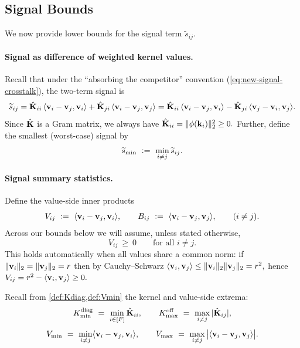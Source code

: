 \subsection{Signal Bounds}
We now provide lower bounds for the signal term $\widetilde{s}_{ij}$.

\paragraph{Signal as difference of weighted kernel values.}
Recall that under the ``absorbing the competitor'' convention (\eqref{eq:new-signal-crosstalk}), the two-term signal is
\begin{equation}
\widetilde{s}_{ij}
=\hat{\mathbf{K}}_{ii}\,\langle {{\mathbf{v}}_{i}-{\mathbf{v}}_j}, {{\mathbf{v}}_i} \rangle
+\hat{\mathbf{K}}_{ji}\,\langle {{\mathbf{v}}_{i}-{\mathbf{v}}_j}, {{\mathbf{v}}_j} \rangle
=\hat{\mathbf{K}}_{ii}\,\langle {{\mathbf{v}}_{i}-{\mathbf{v}}_j}, {{\mathbf{v}}_i} \rangle
-\hat{\mathbf{K}}_{ji}\,\langle {{\mathbf{v}}_{j}-{\mathbf{v}}_i}, {{\mathbf{v}}_j} \rangle.
\label{eq:sij-two-term}
\end{equation}
Since $\hat{\mathbf{K}}$ is a Gram matrix, we always have
\(
\hat{\mathbf{K}}_{ii}=\|\phi({\mathbf{k}}_{i})\|_{2}^2\ge 0.
\)
Further, define the smallest (worst-case) signal by
\begin{equation}
\widetilde{s}_{\min}\ \vcentcolon=\ \min_{i\neq j}\widetilde{s}_{ij}.
\label{eq:smin}
\end{equation}

\paragraph{Signal summary statistics.}
Define the value-side inner products
\begin{equation}
V_{ij}\ \vcentcolon=\ \langle {{\mathbf{v}}_{i}-{\mathbf{v}}_j}, {{\mathbf{v}}_i} \rangle,
\qquad
B_{ij}\ \vcentcolon=\ \langle {{\mathbf{v}}_{i}-{\mathbf{v}}_j}, {{\mathbf{v}}_j} \rangle,
\qquad (i\neq j).
\label{eq:AijBij}
\end{equation}
Across our bounds below we will assume, unless stated otherwise,
\begin{equation}
V_{ij}\ \ge\ 0
\qquad\text{for all }i\neq j.
\label{eq:Apos}
\end{equation}
This holds automatically when all values share a common norm:
if $\|{\mathbf{v}}_{i}\|_{2}=\|{\mathbf{v}}_{j}\|_{2}=r$ then by Cauchy--Schwarz
\(
\langle {{\mathbf{v}}_i}, {{\mathbf{v}}_j} \rangle\le \|{\mathbf{v}}_{i}\|_{2}\|{\mathbf{v}}_{j}\|_{2}=r^2,
\)
hence
\(
V_{ij}=r^2-\langle {{\mathbf{v}}_i}, {{\mathbf{v}}_j} \rangle\ge 0.
\)

Recall from \cref{def:Kdiag,def:Vmin} the kernel and value-side extrema:
\begin{equation}
K_{\min}^{\mathrm{diag}}\ =\ \min_{i\in[F]} \hat{\mathbf{K}}_{ii},
\qquad
K_{\max}^{\mathrm{off}}\ =\ \max_{i\neq j}|\hat{\mathbf{K}}_{ij}|,
\label{eq:KminKmax}
\end{equation}
\begin{equation}
V_{\min}\ =\ \min_{i\neq j}\ip{\vv_{i}-\vv_j}{\vv_i},
\qquad
V_{\max}\ =\ \max_{i\neq j}\big|\ip{\vv_{i}-\vv_j}{\vv_j}\big|.
\label{eq:AminBmax}
\end{equation}


